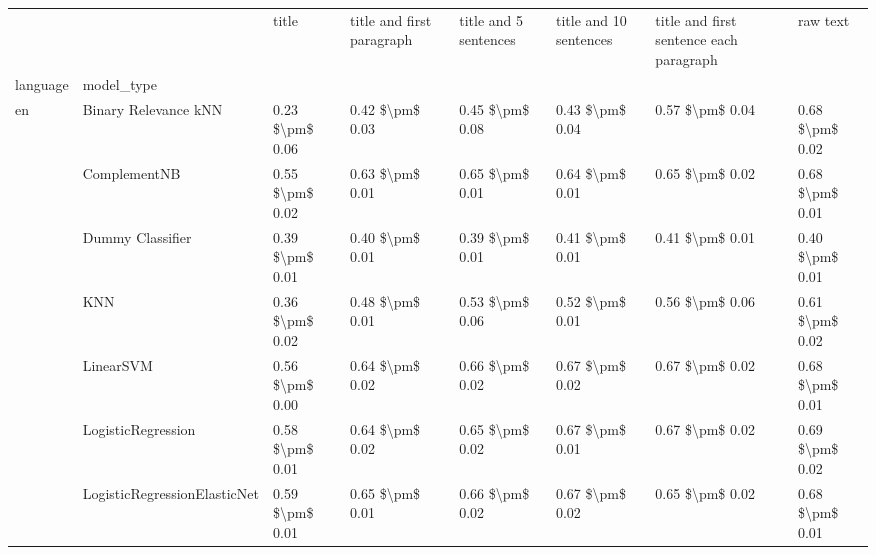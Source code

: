 \begin{tabular}{llllllll}
\toprule
   &         &            title & title and first paragraph & title and 5 sentences & title and 10 sentences & title and first sentence each paragraph &             raw text \\
language & model\_type &                  &                           &                       &                        &                                         &                      \\
\midrule
en & Binary Relevance kNN &  0.23 \$\textbackslash pm\$ 0.06 &           0.42 \$\textbackslash pm\$ 0.03 &       0.45 \$\textbackslash pm\$ 0.08 &        0.43 \$\textbackslash pm\$ 0.04 &                         0.57 \$\textbackslash pm\$ 0.04 &      0.68 \$\textbackslash pm\$ 0.02 \\
   & ComplementNB &  0.55 \$\textbackslash pm\$ 0.02 &           0.63 \$\textbackslash pm\$ 0.01 &       0.65 \$\textbackslash pm\$ 0.01 &        0.64 \$\textbackslash pm\$ 0.01 &                         0.65 \$\textbackslash pm\$ 0.02 &      0.68 \$\textbackslash pm\$ 0.01 \\
   & Dummy Classifier &  0.39 \$\textbackslash pm\$ 0.01 &           0.40 \$\textbackslash pm\$ 0.01 &       0.39 \$\textbackslash pm\$ 0.01 &        0.41 \$\textbackslash pm\$ 0.01 &                         0.41 \$\textbackslash pm\$ 0.01 &      0.40 \$\textbackslash pm\$ 0.01 \\
   & KNN &  0.36 \$\textbackslash pm\$ 0.02 &           0.48 \$\textbackslash pm\$ 0.01 &       0.53 \$\textbackslash pm\$ 0.06 &        0.52 \$\textbackslash pm\$ 0.01 &                         0.56 \$\textbackslash pm\$ 0.06 &      0.61 \$\textbackslash pm\$ 0.02 \\
   & LinearSVM &  0.56 \$\textbackslash pm\$ 0.00 &           0.64 \$\textbackslash pm\$ 0.02 &       0.66 \$\textbackslash pm\$ 0.02 &        0.67 \$\textbackslash pm\$ 0.02 &                         0.67 \$\textbackslash pm\$ 0.02 &      0.68 \$\textbackslash pm\$ 0.01 \\
   & LogisticRegression &  0.58 \$\textbackslash pm\$ 0.01 &           0.64 \$\textbackslash pm\$ 0.02 &       0.65 \$\textbackslash pm\$ 0.02 &        0.67 \$\textbackslash pm\$ 0.01 &                         0.67 \$\textbackslash pm\$ 0.02 &      0.69 \$\textbackslash pm\$ 0.02 \\
   & LogisticRegressionElasticNet &  0.59 \$\textbackslash pm\$ 0.01 &           0.65 \$\textbackslash pm\$ 0.01 &       0.66 \$\textbackslash pm\$ 0.02 &        0.67 \$\textbackslash pm\$ 0.02 &                         0.65 \$\textbackslash pm\$ 0.02 &      0.68 \$\textbackslash pm\$ 0.01 \\

\end{tabular}
